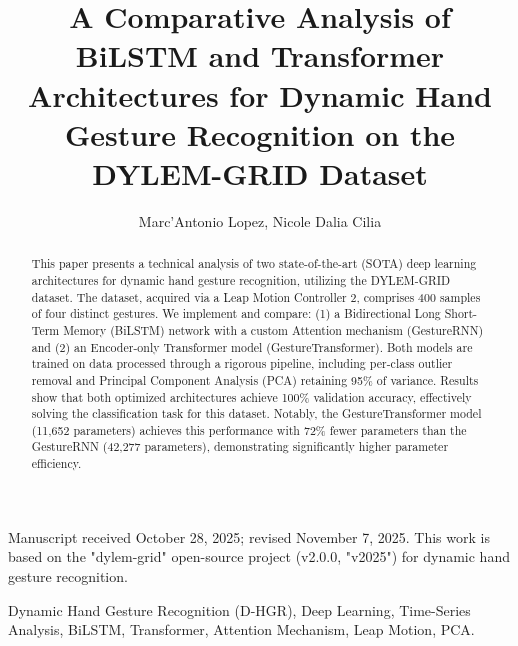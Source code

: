 \documentclass[]{IEEEphot}
\begin{document}
\title{A Comparative Analysis of BiLSTM and Transformer Architectures for Dynamic Hand Gesture Recognition on the DYLEM-GRID Dataset}

\author{Marc'Antonio Lopez, Nicole Dalia Cilia}



\maketitle

\begin{receivedinfo}%
Manuscript received October 28, 2025; revised November 7, 2025.
This work is based on the "dylem-grid" open-source project (v2.0.0, "v2025") for dynamic hand gesture recognition.
\end{receivedinfo}


\begin{abstract}
This paper presents a technical analysis of two state-of-the-art (SOTA) deep learning architectures for dynamic hand gesture recognition, utilizing the DYLEM-GRID dataset. The dataset, acquired via a Leap Motion Controller 2, comprises 400 samples of four distinct gestures. We implement and compare: (1) a Bidirectional Long Short-Term Memory (BiLSTM) network with a custom Attention mechanism (GestureRNN) and (2) an Encoder-only Transformer model (GestureTransformer). Both models are trained on data processed through a rigorous pipeline, including per-class outlier removal and Principal Component Analysis (PCA) retaining 95\% of variance. Results show that both optimized architectures achieve 100\% validation accuracy, effectively solving the classification task for this dataset. Notably, the GestureTransformer model (11,652 parameters) achieves this performance with 72\% fewer parameters than the GestureRNN (42,277 parameters), demonstrating significantly higher parameter efficiency.
\end{abstract}

\begin{IEEEkeywords}
Dynamic Hand Gesture Recognition (D-HGR), Deep Learning, Time-Series Analysis, BiLSTM, Transformer, Attention Mechanism, Leap Motion, PCA.
\end{IEEEkeywords}
\end{document}

